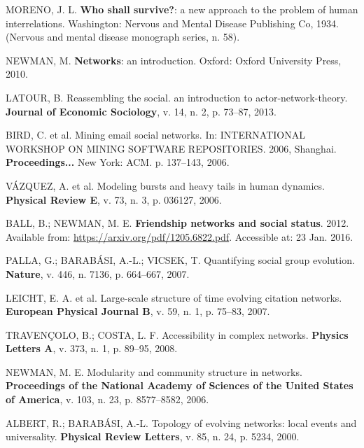 \documentclass[
12pt,		%
openright,	%
twoside,  %
a4paper,			%
chapter=TITLE,		%
english,			%
french,				%
spanish,			%
brazil				%
]{USPSC}
\begin{document}
% 
\begin{thebibliography}{999}

	MORENO, J. L. \textbf{Who shall survive?}: a new approach to the problem of human interrelations. Washington: Nervous and Mental Disease Publishing Co, 1934. (Nervous and mental disease monograph series, n. 58).

	NEWMAN, M. \textbf{Networks}: an introduction. Oxford: Oxford University Press, 2010.

	LATOUR, B. Reassembling the social. an introduction to actor-network-theory. \textbf{Journal of Economic Sociology}, v. 14, n. 2, p. 73–87, 2013.

	BIRD, C. et al. Mining email social networks. In: INTERNATIONAL WORKSHOP ON MINING SOFTWARE REPOSITORIES. 2006, Shanghai. \textbf{Proceedings...} New York: ACM. p. 137–143, 2006.

	VÁZQUEZ, A. et al. Modeling bursts and heavy tails in human dynamics. \textbf{Physical Review E}, v. 73, n. 3, p. 036127, 2006.

	BALL, B.; NEWMAN, M. E. \textbf{Friendship networks and social status}.  2012. Available from: \url{https://arxiv.org/pdf/1205.6822.pdf}. Accessible  at: 23 Jan. 2016.

	PALLA, G.; BARABÁSI, A.-L.; VICSEK, T. Quantifying social group evolution. \textbf{Nature}, v. 446, n. 7136, p. 664–667, 2007.

	LEICHT, E. A. et al.  Large-scale structure of time evolving citation networks. \textbf{European Physical Journal B}, v. 59, n. 1, p. 75–83, 2007.

	TRAVENÇOLO, B.; COSTA, L. F. Accessibility in complex networks. \textbf{Physics Letters A}, v. 373, n. 1, p. 89–95, 2008.

	NEWMAN, M. E. Modularity and community structure in networks. \textbf{Proceedings of the National Academy of Sciences of the United States of America}, v. 103, n. 23, p. 8577–8582, 2006.

	ALBERT, R.; BARABÁSI, A.-L. Topology of evolving networks: local events and universality. \textbf{Physical Review Letters}, v. 85, n. 24, p. 5234, 2000.


\end{thebibliography}
\end{document}

